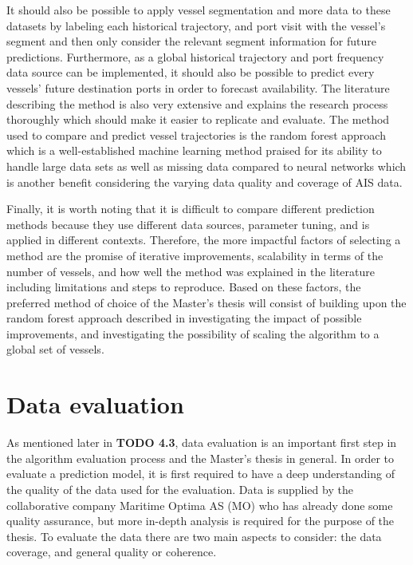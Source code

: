 It should also be possible to apply vessel segmentation and more data to these datasets by labeling each historical trajectory, and port visit with the vessel’s segment and then only consider the relevant segment information for future predictions. Furthermore, as a global historical trajectory and port frequency data source can be implemented, it should also be possible to predict every vessels’ future destination ports in order to forecast availability.  The literature describing the method is also very extensive and explains the research process thoroughly which should make it easier to replicate and evaluate. The method used to compare and predict vessel trajectories is the random forest approach which is a well-established machine learning method praised for its ability to handle large data sets as well as missing data compared to neural networks \parencite{Randomforest_website} which is another benefit considering the varying data quality and coverage of AIS data.

Finally, it is worth noting that it is difficult to compare different prediction methods because they use different data sources, parameter tuning, and is applied in different contexts. Therefore, the more impactful factors of selecting a method are the promise of iterative improvements, scalability in terms of the number of vessels, and how well the method was explained in the literature including limitations and steps to reproduce. Based on these factors, the preferred method of choice of the Master’s thesis will consist of building upon the random forest approach described in \cite{ZHANG2020102729} investigating the impact of possible improvements, and investigating the possibility of scaling the algorithm to a global set of vessels.


\section{Data evaluation}

As mentioned later in \textbf{TODO 4.3}, data evaluation is an important first step in the algorithm evaluation process and the Master’s thesis in general. In order to evaluate a prediction model, it is first required to have a deep understanding of the quality of the data used for the evaluation. Data is supplied by the collaborative company Maritime Optima AS (MO) who has already done some quality assurance, but more in-depth analysis is required for the purpose of the thesis. To evaluate the data there are two main aspects to consider: the data coverage, and general quality or coherence. 

